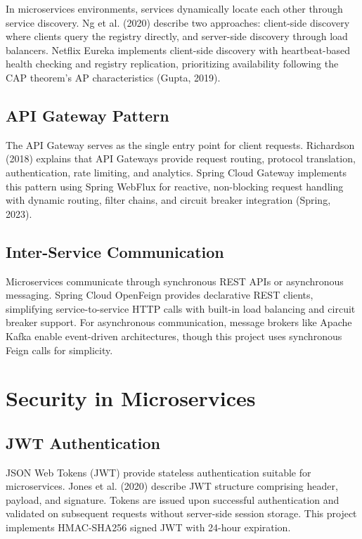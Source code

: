 In microservices environments, services dynamically locate each other through service discovery. Ng et al. (2020) describe two approaches: client-side discovery where clients query the registry directly, and server-side discovery through load balancers. Netflix Eureka implements client-side discovery with heartbeat-based health checking and registry replication, prioritizing availability following the CAP theorem's AP characteristics (Gupta, 2019).

\subsection{API Gateway Pattern}

The API Gateway serves as the single entry point for client requests. Richardson (2018) explains that API Gateways provide request routing, protocol translation, authentication, rate limiting, and analytics. Spring Cloud Gateway implements this pattern using Spring WebFlux for reactive, non-blocking request handling with dynamic routing, filter chains, and circuit breaker integration (Spring, 2023).

\subsection{Inter-Service Communication}

Microservices communicate through synchronous REST APIs or asynchronous messaging. Spring Cloud OpenFeign provides declarative REST clients, simplifying service-to-service HTTP calls with built-in load balancing and circuit breaker support. For asynchronous communication, message brokers like Apache Kafka enable event-driven architectures, though this project uses synchronous Feign calls for simplicity.

\section{Security in Microservices}

\subsection{JWT Authentication}

JSON Web Tokens (JWT) provide stateless authentication suitable for microservices. Jones et al. (2020) describe JWT structure comprising header, payload, and signature. Tokens are issued upon successful authentication and validated on subsequent requests without server-side session storage. This project implements HMAC-SHA256 signed JWT with 24-hour expiration.

